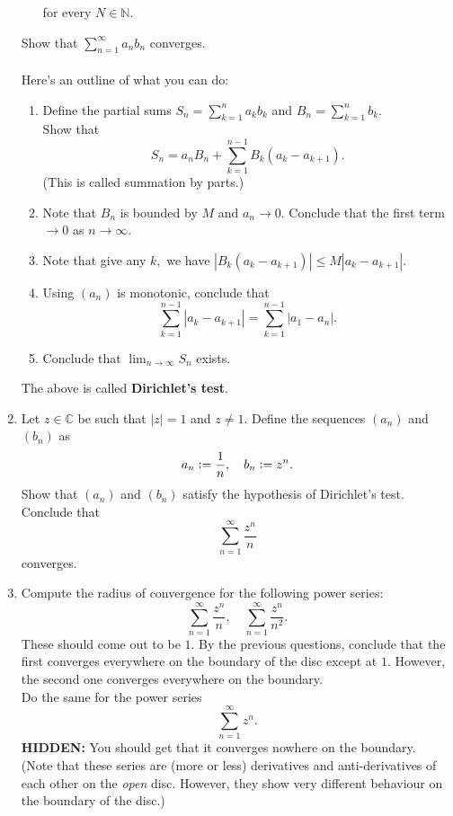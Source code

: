 \documentclass[12pt]{article}
\theoremstyle{definition}
\numberwithin{thm}{section}
\newcommand{\hint}[1]{\textbf{HIDDEN:} {\color[rgb]{0.95, 0.95, 0.95}#1}}
\begin{document}
\begin{enumerate}
\begin{enumerate}
		for every $N \in \mathbb{N}.$
	\end{enumerate}
	Show that $\displaystyle\sum_{n=1}^{\infty}a_nb_n$ converges.\\~\\
	Here's an outline of what you can do:
	\begin{enumerate}
		\item Define the partial sums $S_n = \displaystyle\sum_{k=1}^{n}a_kb_k$ and $B_n = \displaystyle\sum_{k=1}^{n}b_k.$\\
		Show that
		\begin{equation*} 
			S_n = a_nB_n + \sum_{k=1}^{n-1}B_k(a_k - a_{k+1}).
		\end{equation*}
		(This is called summation by parts.)
		\item Note that $B_n$ is bounded by $M$ and $a_n \to 0.$ Conclude that the first term $\to 0$ as $n \to \infty.$
		\item Note that give any $k,$ we have $|B_k(a_k - a_{k+1})| \le M|a_k - a_{k+1}|.$
		\item Using $(a_n)$ is monotonic, conclude that
		\begin{equation*} 
			\sum_{k=1}^{n-1}|a_k - a_{k+1}| = \sum_{k=1}^{n-1}|a_1 - a_n|.
		\end{equation*}
		\item Conclude that $\displaystyle\lim_{n\to \infty}S_n$ exists.
	\end{enumerate}
	The above is called \textbf{Dirichlet's test}.
	\item Let $z \in \mathbb{C}$ be such that $|z| = 1$ and $z \neq 1.$ Define the sequences $(a_n)$ and $(b_n)$ as
	\begin{equation*} 
		a_n \vcentcolon= \dfrac{1}{n}, \quad b_n \vcentcolon= z^n.
	\end{equation*}
	Show that $(a_n)$ and $(b_n)$ satisfy the hypothesis of Dirichlet's test. Conclude that
	\begin{equation*} 
		\sum_{n=1}^{\infty}\dfrac{z^n}{n}
	\end{equation*}
	converges.
	\item Compute the radius of convergence for the following power series:
	\begin{equation*} 
		\sum_{n=1}^{\infty}\dfrac{z^n}{n}, \quad \sum_{n=1}^{\infty}\dfrac{z^n}{n^2}.
	\end{equation*}
	These should come out to be $1.$ By the previous questions, conclude that the first converges everywhere on the boundary of the disc except at $1.$ However, the second one converges everywhere on the boundary.\\
	Do the same for the power series
	\begin{equation*} 
		\sum_{n=1}^{\infty}z^n.
	\end{equation*}
	\hint{You should get that it converges nowhere on the boundary.}\\
	(Note that these series are (more or less) derivatives and anti-derivatives of each other on the \emph{open} disc. However, they show very different behaviour on the boundary of the disc.)
\end{enumerate}
\end{document}
